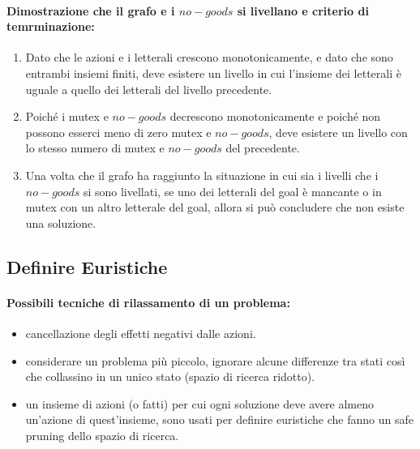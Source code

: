 \paragraph{Dimostrazione che il grafo e i $no-goods$ si livellano e criterio di temrminazione:}

\begin{enumerate}
  \item Dato che le azioni e i letterali crescono monotonicamente, e dato che sono entrambi insiemi finiti, deve esistere un livello in cui l’insieme dei letterali è uguale a quello dei letterali del livello precedente. 
  \item Poiché i mutex e $no-goods$ decrescono monotonicamente e poiché non possono esserci meno di zero mutex e $no-goods$, deve esistere un livello con lo stesso numero di mutex e $no-goods$ del precedente. 
  \item Una volta che il grafo ha raggiunto la situazione in cui sia i livelli che i $no-goods$ si sono livellati, se uno dei letterali del goal è mancante o in mutex con un altro letterale del goal, allora si può concludere che non esiste una soluzione.
\end{enumerate}


\subsection{Definire Euristiche}


\paragraph{Possibili tecniche di rilassamento di un problema:}

\begin{itemize}
  \item {} cancellazione degli effetti negativi dalle azioni. 
  \item {} considerare un problema più piccolo, ignorare alcune differenze tra stati così che  collassino in un unico stato (spazio di ricerca ridotto). 
  \item {} un insieme di azioni (o fatti) per cui ogni soluzione deve avere almeno un'azione di quest'insieme, sono usati per definire euristiche che fanno un safe pruning dello spazio di ricerca.
\end{itemize}

